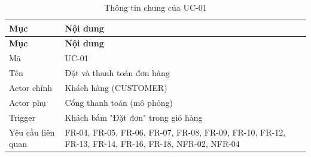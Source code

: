{\small
\begin{longtable}{@{}L{3.2cm}L{10.7cm}@{}}
\caption{Thông tin chung của UC-01}\label{tab:ucinfo}\\
\toprule
\textbf{Mục} & \textbf{Nội dung} \\ \midrule \endfirsthead
\toprule \textbf{Mục} & \textbf{Nội dung} \\ \midrule \endhead
\bottomrule \endfoot
Mã & UC-01 \\
Tên & Đặt và thanh toán đơn hàng \\
Actor chính & Khách hàng (CUSTOMER) \\
Actor phụ & Cổng thanh toán (mô phỏng) \\
Trigger & Khách bấm "Đặt đơn" trong giỏ hàng \\
Yêu cầu liên quan & FR-04, FR-05, FR-06, FR-07, FR-08, FR-09, FR-10, FR-12, FR-13, FR-14, FR-16, FR-18, NFR-02, NFR-04 \\
\end{longtable}
}